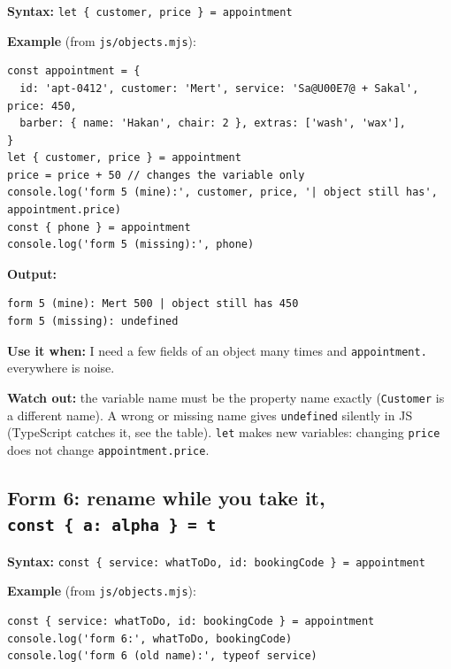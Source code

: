 \textbf{Syntax:} \passthrough{\lstinline!let \{ customer, price \} = appointment!}

\textbf{Example} (from \passthrough{\lstinline!js/objects.mjs!}):

\begin{lstlisting}
const appointment = {
  id: 'apt-0412', customer: 'Mert', service: 'Sa@U00E7@ + Sakal', price: 450,
  barber: { name: 'Hakan', chair: 2 }, extras: ['wash', 'wax'],
}
let { customer, price } = appointment
price = price + 50 // changes the variable only
console.log('form 5 (mine):', customer, price, '| object still has', appointment.price)
const { phone } = appointment
console.log('form 5 (missing):', phone)
\end{lstlisting}

\textbf{Output:}

\begin{lstlisting}
form 5 (mine): Mert 500 | object still has 450
form 5 (missing): undefined
\end{lstlisting}

\textbf{Use it when:} I need a few fields of an object many times and \passthrough{\lstinline!appointment.!} everywhere is noise.

\textbf{Watch out:} the variable name must be the property name exactly (\passthrough{\lstinline!Customer!} is a different name).
A wrong or missing name gives \passthrough{\lstinline!undefined!} silently in JS (TypeScript catches it, see the table).
\passthrough{\lstinline!let!} makes new variables: changing \passthrough{\lstinline!price!} does not change \passthrough{\lstinline!appointment.price!}.

\subsection{\texorpdfstring{Form 6: rename while you take it, \texttt{const\ \{\ a:\ alpha\ \}\ =\ t}}{Form 6: rename while you take it, const \{ a: alpha \} = t}}\label{form-6-rename-while-you-take-it-const-a-alpha-t}

\textbf{Syntax:} \passthrough{\lstinline!const \{ service: whatToDo, id: bookingCode \} = appointment!}

\textbf{Example} (from \passthrough{\lstinline!js/objects.mjs!}):

\begin{lstlisting}
const { service: whatToDo, id: bookingCode } = appointment
console.log('form 6:', whatToDo, bookingCode)
console.log('form 6 (old name):', typeof service)
\end{lstlisting}

